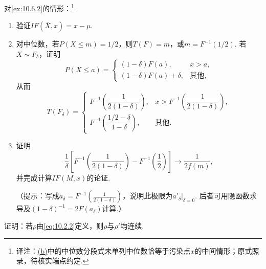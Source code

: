 \begin{exercise}\label{exercise:10.27}
对\autoref{ex:10.6.2}的情形：\footnote{译注：\hyperref[itm:exercise:10.27:b]{(b)}中的中位数分段式未单列中位数恰等于污染点$x$的中间情形；原式照录，待核实端点约定.}
\begin{enumerate}[label=(\alph*)]
\item 验证$IF(\bar X,x)=x-\mu$.
\item{}\label{itm:exercise:10.27:b} 对中位数，若$P(X\leq m)=1/2$，则$T(F)=m$，或$m=F^{-1}(1/2)$. 若$X\sim F_\delta$，证明
$$P(X\leq a)=\begin{cases}(1-\delta)F(a),&x>a,\\(1-\delta)F(a)+\delta,&\text{其他},\end{cases}$$
从而
$$T(F_\delta)=\begin{cases}F^{-1}\left(\dfrac1{2(1-\delta)}\right),&x>F^{-1}\left(\dfrac1{2(1-\delta)}\right),\\F^{-1}\left(\dfrac{1/2-\delta}{1-\delta}\right),&\text{其他}.
\end{cases}$$
\item 证明
$$\frac1\delta\left[F^{-1}\left(\frac1{2(1-\delta)}\right)-F^{-1}\left(\frac12\right)\right]\longrightarrow\frac1{2f(m)},$$
并完成计算$IF(M,x)$的论证.

（提示：写成$a_\delta=F^{-1}\left(\frac1{2(1-\delta)}\right)$，说明此极限为$a'_\delta|_{\delta=0}$. 后者可用隐函数求导及$(1-\delta)^{-1}=2F(a_\delta)$计算.）
\end{enumerate}
\end{exercise}

\begin{exercise}\label{exercise:10.28}
证明：若$\rho$由\eqref{eq:10.2.2}定义，则$\rho$与$\rho'$均连续.
\end{exercise}

